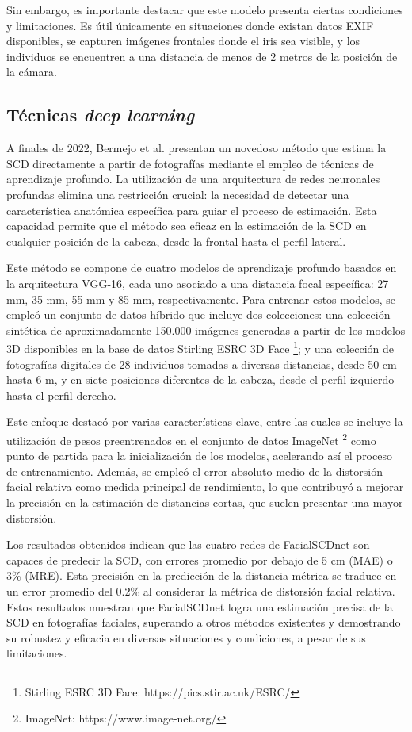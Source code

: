 Sin embargo, es importante destacar que este modelo presenta ciertas condiciones y limitaciones. Es útil únicamente en situaciones donde existan datos EXIF disponibles, se capturen imágenes frontales donde el iris sea visible, y los individuos se encuentren a una distancia de menos de 2 metros de la posición de la cámara.

\subsection{Técnicas \textit{deep learning}}

A finales de 2022, Bermejo et al. \cite{14} presentan un novedoso método que estima la SCD directamente a partir de fotografías mediante el empleo de técnicas de aprendizaje profundo. La utilización de una arquitectura de redes neuronales profundas elimina una restricción crucial: la necesidad de detectar una característica anatómica específica para guiar el proceso de estimación. Esta capacidad permite que el método sea eficaz en la estimación de la SCD en cualquier posición de la cabeza, desde la frontal hasta el perfil lateral.

Este método se compone de cuatro modelos de aprendizaje profundo basados en la arquitectura VGG-16, cada uno asociado a una distancia focal específica: 27 mm, 35 mm, 55 mm y 85 mm, respectivamente. Para entrenar estos modelos, se empleó un conjunto de datos híbrido que incluye dos colecciones: una colección sintética de aproximadamente 150.000 imágenes generadas a partir de los modelos 3D disponibles en la base de datos Stirling ESRC 3D Face \footnote{Stirling ESRC 3D Face: https://pics.stir.ac.uk/ESRC/}; y una colección de fotografías digitales de 28 individuos tomadas a diversas distancias, desde 50 cm hasta 6 m, y en siete posiciones diferentes de la cabeza, desde el perfil izquierdo hasta el perfil derecho.

Este enfoque destacó por varias características clave, entre las cuales se incluye la utilización de pesos preentrenados en el conjunto de datos ImageNet \footnote{ImageNet: https://www.image-net.org/} como punto de partida para la inicialización de los modelos, acelerando así el proceso de entrenamiento. Además, se empleó el error absoluto medio de la distorsión facial relativa como medida principal de rendimiento, lo que contribuyó a mejorar la precisión en la estimación de distancias cortas, que suelen presentar una mayor distorsión.

Los resultados obtenidos indican que las cuatro redes de FacialSCDnet son capaces de predecir la SCD, con errores promedio por debajo de 5 cm (MAE) o 3\% (MRE). Esta precisión en la predicción de la distancia métrica se traduce en un error promedio del 0.2\% al considerar la métrica de distorsión facial relativa. Estos resultados muestran que FacialSCDnet logra una estimación precisa de la SCD en fotografías faciales, superando a otros métodos existentes y demostrando su robustez y eficacia en diversas situaciones y condiciones, a pesar de sus limitaciones.